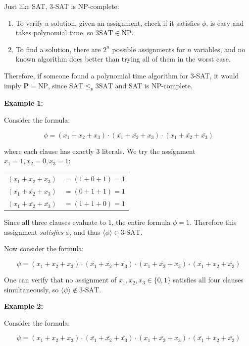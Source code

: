 \documentclass[12pt,a4paper,openany]{article}
\begin{document}
Just like SAT, 3-SAT is NP-complete:

\begin{enumerate}
    \item To verify a solution, given an assignment, check if it satisfies $\phi$, is easy and takes polynomial time, so $\mathrm{3SAT} \in \mathrm{NP}$.
    \item To find a solution, there are $2^n$ possible assignments for $n$ variables, and no known algorithm does better than trying all of them in the worst case.
\end{enumerate}

Therefore, if someone found a polynomial time algorithm for 3-SAT, it would imply $\mathbf{P}  = \mathrm{NP}$, since $\mathrm{SAT} \leq_p \mathrm{3SAT}$ and SAT is NP-complete.

\textbf{Example 1:}

Consider the formula:

\[
\phi = (x_1 + x_2 + x_3) \cdot (\bar{x_1} + \bar{x_2} + x_3) \cdot (x_1 + \bar{x_2} + \bar{x_3})
\]

where each clause has exactly 3 literals. We try the assignment $x_1 = 1, x_2 = 0, x_3 = 1$:

\begin{center}
\begin{tabular}{ll}
$(x_1 + x_2 + x_3)$ & $= (1 + 0 + 1) = 1$ \\
$(\bar{x_1} + \bar{x_2} + x_3)$ & $= (0 + 1 + 1) = 1$ \\
$(x_1 + \bar{x_2} + \bar{x_3})$ & $= (1 + 1 + 0) = 1$ \\
\end{tabular}
\end{center}

Since all three clauses evaluate to $1$, the entire formula $\phi = 1$. Therefore this assignment \emph{satisfies} $\phi$, and thus $\langle \phi \rangle \in \text{3-SAT}$.

Now consider the formula:

\[
\psi = (x_1 + x_2 + x_3) \cdot (\bar{x_1} + \bar{x_2} + \bar{x_3}) \cdot (x_1 + \bar{x_2} + x_3) \cdot (\bar{x_1} + x_2 + \bar{x_3})
\]

One can verify that no assignment of $x_1, x_2, x_3 \in \{0, 1\}$ satisfies all four clauses simultaneously, so $\langle \psi \rangle \notin \text{3-SAT}$.

\textbf{Example 2:}

Consider the formula:

\[
\psi = (x_1 + x_2 + x_3) \cdot (\bar{x_1} + \bar{x_2} + \bar{x_3}) \cdot (x_1 + \bar{x_2} + x_3) \cdot (\bar{x_1} + x_2 + \bar{x_3})
\]
\end{document}
